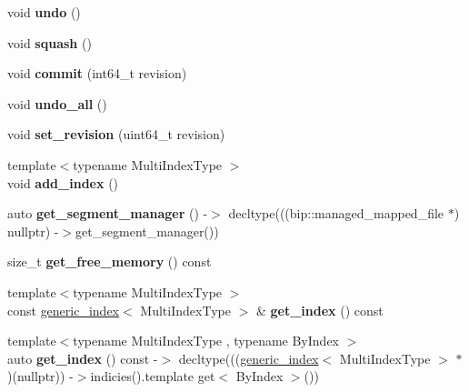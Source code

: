\begin{DoxyCompactItemize}
void {\bfseries undo} ()
\item 
\mbox{\label{classchainbase_1_1database_ace133a4e1820ea8663fb4eaa19145e57}} 
void {\bfseries squash} ()
\item 
\mbox{\label{classchainbase_1_1database_aca6d7bcd700644f077b89203b2e8b7ef}} 
void {\bfseries commit} (int64\+\_\+t revision)
\item 
\mbox{\label{classchainbase_1_1database_a832c383b7d8573d399e6149d4c715bd6}} 
void {\bfseries undo\+\_\+all} ()
\item 
\mbox{\label{classchainbase_1_1database_a24e7f6336cad0bd2fc280dab381665ed}} 
void {\bfseries set\+\_\+revision} (uint64\+\_\+t revision)
\item 
\mbox{\label{classchainbase_1_1database_a43a85f8b7d728b69dbf7a9d69c9ebc1c}} 
{\footnotesize template$<$typename Multi\+Index\+Type $>$ }\\void {\bfseries add\+\_\+index} ()
\item 
\mbox{\label{classchainbase_1_1database_ad29b3ffb2c3336a8c85883df08b1df44}} 
auto {\bfseries get\+\_\+segment\+\_\+manager} () -\/$>$ decltype(((bip\+::managed\+\_\+mapped\+\_\+file $\ast$) nullptr) -\/$>$get\+\_\+segment\+\_\+manager())
\item 
\mbox{\label{classchainbase_1_1database_a63a87fe56634ee1e93511a894b98e40d}} 
size\+\_\+t {\bfseries get\+\_\+free\+\_\+memory} () const
\item 
\mbox{\label{classchainbase_1_1database_a26c8405cb0481987ebc687d5d9c9f333}} 
{\footnotesize template$<$typename Multi\+Index\+Type $>$ }\\const \mbox{\hyperlink{classchainbase_1_1generic__index}{generic\+\_\+index}}$<$ Multi\+Index\+Type $>$ \& {\bfseries get\+\_\+index} () const
\item 
\mbox{\label{classchainbase_1_1database_ac6cd15ed974db43f42226111770bd515}} 
{\footnotesize template$<$typename Multi\+Index\+Type , typename By\+Index $>$ }\\auto {\bfseries get\+\_\+index} () const -\/$>$ decltype(((\mbox{\hyperlink{classchainbase_1_1generic__index}{generic\+\_\+index}}$<$ Multi\+Index\+Type $>$ $\ast$)(nullptr)) -\/$>$indicies().template get$<$ By\+Index $>$())

\end{DoxyCompactItemize}
